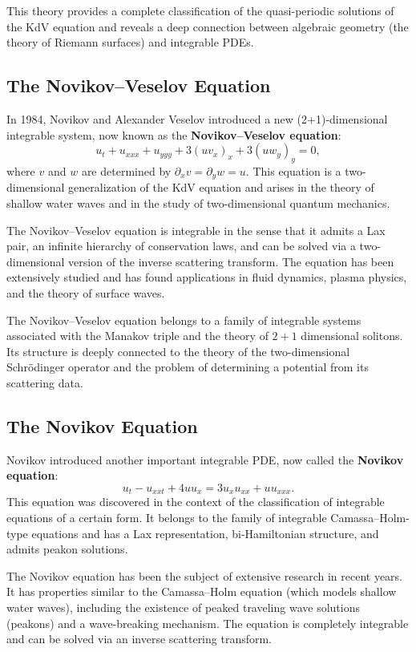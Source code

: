 This theory provides a complete classification of the quasi-periodic solutions of the KdV equation and reveals a deep connection between algebraic geometry (the theory of Riemann surfaces) and integrable PDEs.

\subsection{The Novikov--Veselov Equation}

In 1984, Novikov and Alexander Veselov introduced a new (2+1)-dimensional integrable system, now known as the \textbf{Novikov--Veselov equation}:
\[
u_t + u_{xxx} + u_{yyy} + 3(u v_x)_x + 3(u w_y)_y = 0,
\]
where \(v\) and \(w\) are determined by \(\partial_x v = \partial_y w = u\). This equation is a two-dimensional generalization of the KdV equation and arises in the theory of shallow water waves and in the study of two-dimensional quantum mechanics.

The Novikov--Veselov equation is integrable in the sense that it admits a Lax pair, an infinite hierarchy of conservation laws, and can be solved via a two-dimensional version of the inverse scattering transform. The equation has been extensively studied and has found applications in fluid dynamics, plasma physics, and the theory of surface waves.

The Novikov--Veselov equation belongs to a family of integrable systems associated with the Manakov triple and the theory of \(2+1\) dimensional solitons. Its structure is deeply connected to the theory of the two-dimensional Schr\"odinger operator and the problem of determining a potential from its scattering data.

\subsection{The Novikov Equation}

Novikov introduced another important integrable PDE, now called the \textbf{Novikov equation}:
\[
u_t - u_{xxt} + 4u u_x = 3 u_x u_{xx} + u u_{xxx}.
\]
This equation was discovered in the context of the classification of integrable equations of a certain form. It belongs to the family of integrable Camassa--Holm-type equations and has a Lax representation, bi-Hamiltonian structure, and admits peakon solutions.

The Novikov equation has been the subject of extensive research in recent years. It has properties similar to the Camassa--Holm equation (which models shallow water waves), including the existence of peaked traveling wave solutions (peakons) and a wave-breaking mechanism. The equation is completely integrable and can be solved via an inverse scattering transform.

